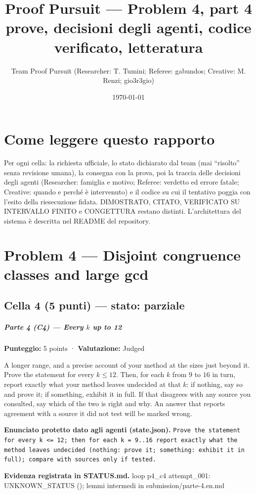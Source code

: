 \documentclass[11pt,a4paper]{article}
\title{Proof Pursuit --- Problem 4, part 4\\ \large prove, decisioni degli agenti, codice verificato, letteratura}
\author{Team Proof Pursuit (Researcher: T. Tumini; Referee: gabundos; Creative: M. Renzi; gio3r3gio)}
\date{\today}
\begin{document}
\maketitle\tableofcontents
\section*{Come leggere questo rapporto}
Per ogni cella: la richiesta ufficiale, lo stato dichiarato dal team (mai ``risolto'' senza revisione umana), la consegna
con la prova, poi la traccia delle decisioni degli agenti (Researcher: famiglia e motivo; Referee: verdetto ed errore
fatale; Creative: quando e perché è intervenuto) e il codice su cui il tentativo poggia con l'esito della riesecuzione
fidata. DIMOSTRATO, CITATO, VERIFICATO SU INTERVALLO FINITO e CONGETTURA restano distinti. L'architettura del sistema
è descritta nel README del repository.
\section{Problem 4 — Disjoint congruence classes and large gcd}
\subsection{Cella 4 (5 punti) — stato: parziale}
\subparagraph{\texorpdfstring{Parte 4 (C4) --- Every \(k\) up to
12}{Parte 4 (C4) --- Every k up to 12}}\label{parte-4-c4-every-k-up-to-12}

\textbf{Punteggio:} 5 points · \textbf{Valutazione:} Judged

A longer range, and a precise account of your method at the sizes just
beyond it. Prove the statement for every \(k \le 12\). Then, for each
\(k\) from \(9\) to \(16\) in turn, report exactly what your method
leaves undecided at that \(k\): if nothing, say so and prove it; if
something, exhibit it in full. If that disagrees with any source you
consulted, say which of the two is right and why. An answer that reports
agreement with a source it did not test will be marked wrong.

\textbf{Enunciato protetto dato agli agenti (state.json).} \texttt{Prove the statement for every k \textless{}= 12; then for each k = 9..16 report exactly what the method leaves undecided (nothing: prove it; something: exhibit it in full); compare with sources only if tested.}

\textbf{Evidenza registrata in STATUS.md.} loop p4\_c4 attempt\_001: UNKNOWN\_STATUS (); lemmi intermedi in submission/parte-4.en.md
\end{document}
